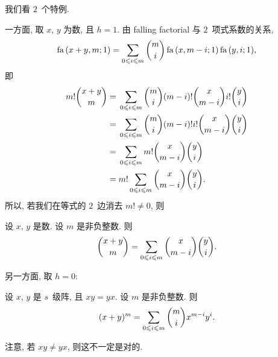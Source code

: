 \documentclass[../libro.tex]{subfiles}
\begin{document}
我们看 \(2\)~个特例.

一方面, 取 \(x\), \(y\) 为数, 且 \(h = 1\).
由 falling factorial 与 \(2\)~项式系数的关系,
\begin{align*}
    \operatorname{fa} {(x + y, m; 1)}
    = \sum_{0 \leq i \leq m} {
        \dbinom{m}{i}
        \operatorname{fa} {(x, m - i; 1)}
        \operatorname{fa} {(y, i; 1)}
    },
\end{align*}
即
\begin{align*}
    m! \dbinom{x + y}{m}
    = {} &
    \sum_{0 \leq i \leq m} {
        \dbinom{m}{i}
        (m - i)! \dbinom{x}{m - i}
        i! \dbinom{y}{i}
    }
    \\
    = {} &
    \sum_{0 \leq i \leq m} {
        \dbinom{m}{i} (m - i)! i!
        \dbinom{x}{m - i}
        \dbinom{y}{i}
    }
    \\
    = {} & \sum_{0 \leq i \leq m} {
        m!
        \dbinom{x}{m - i}
        \dbinom{y}{i}
    }
    \\
    = {} & m! \sum_{0 \leq i \leq m} {
        \dbinom{x}{m - i}
        \dbinom{y}{i}
    }.
\end{align*}
所以, 若我们在等式的 \(2\)~边消去 \(m! \neq 0\), 则

\begin{theorem}
    设 \(x\), \(y\) 是数.
    设 \(m\) 是非负整数.
    则
    \begin{align*}
        \dbinom{x + y}{m}
        = \sum_{0 \leq i \leq m} {\dbinom{x}{m - i} \dbinom{y}{i}}.
    \end{align*}
\end{theorem}

另一方面, 取 \(h = 0\):

\begin{theorem}[\(2\)~项式展开]
    设 \(x\), \(y\) 是 \(s\)~级阵,
    且 \(x y = y x\).
    设 \(m\) 是非负整数.
    则
    \begin{align*}
        (x + y)^m = \sum_{0 \leq i \leq m} {\dbinom{m}{i} x^{m-i} y^i}.
    \end{align*}
\end{theorem}

注意, 若 \(x y \neq y x\), 则这不一定是对的.
\end{document}
